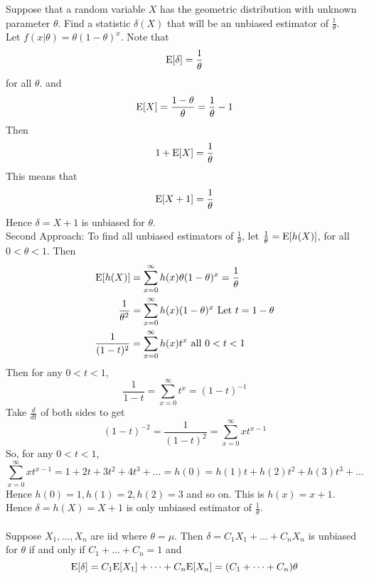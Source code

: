 \documentclass[12pt]{article}
\begin{document}
Suppose that a random variable $X$ has the geometric distribution with unknown parameter $\theta$. Find a statistic $\delta(X)$ that will be an unbiased estimator of $\frac{1}{\theta}$. \\
Let $f(x|\theta) = \theta(1-\theta)^x$. Note that $$ \mathrm{E}[ \delta ] = \frac{1}{\theta}$$ for all $\theta$. and $$ \mathrm{E}[ X ] = \frac{1-\theta}{\theta} = \frac{1}{\theta} - 1$$ Then $$ 1 + \mathrm{E}[ X ] = \frac{1}{\theta}$$ This means that $$\mathrm{E}[ X+1 ] = \frac{1}{\theta}$$ Hence $\delta = X+1$ is unbiased for $\theta$. \\
Second Approach: To find all unbiased estimators of $\frac{1}{\theta}$, let $\frac{1}{\theta} = \mathrm{E}[ h(X) ]$, for all $0 < \theta < 1$. Then $$ \begin{aligned} \mathrm{E}[ h(X) ] &= \sum_{x=0}^\infty h(x) \theta(1-\theta)^x = \frac{1}{\theta} \\ \frac{1}{\theta^2} &= \sum_{x=0}^\infty h(x)(1-\theta)^x \text{ Let } t = 1 - \theta \\ \frac{1}{(1-t)^2} &= \sum_{x=0}^\infty h(x)t^x \text{ all } 0 < t < 1 \end{aligned} $$ Then for any $0<t<1$, $$ \frac{1}{1-t} = \sum_{x=0}^\infty t^x = (1-t)^{-1} $$ 
Take $\frac{d}{dt}$ of both sides to get $$ (1 - t)^{-2} = \frac{1}{(1-t)^2} = \sum_{x=0}^\infty xt^{x-1} $$ So, for any $0 < t < 1$, $$ \sum_{x=0}^\infty xt^{x-1} = 1 + 2t + 3t^2 + 4t^3 + \dots = h(0) = h(1)t + h(2)t^2 + h(3)t^3 + \dots $$ 
Hence $h(0) = 1, h(1) = 2, h(2) = 3$ and so on. This is $h(x) = x+1$. Hence $\delta = h(X) = X+1$ is only unbiased estimator of $\frac{1}{\theta}$. \\~\\
Suppose $X_1,\dots,X_n$ are iid where $\theta = \mu$. Then $\delta = C_1X_1 + \dots + C_nX_n$ is unbiased for $\theta$ if and only if $C_1 + \dots + C_n = 1$ and $$ \mathrm{E}[ \delta ] = C_1\mathrm{E}[ X_1 ] + \dots + C_n\mathrm{E}[ X_n ] = (C_1 + \dots + C_n)\theta $$ 
\end{document}
